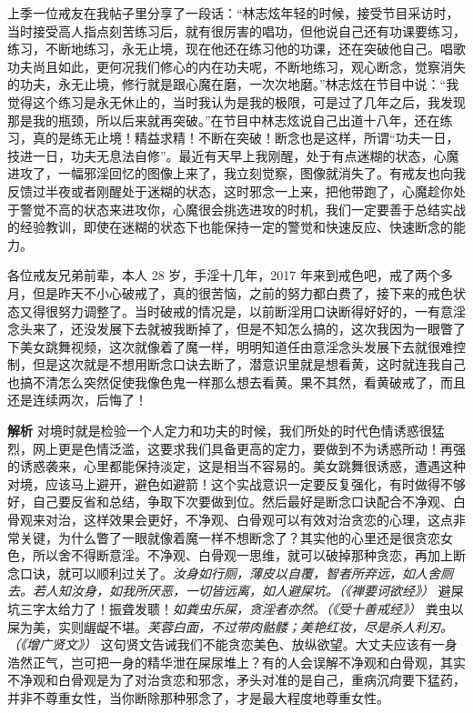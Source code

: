 \begin{case}[不是口诀没用]
    上季一位戒友在我帖子里分享了一段话：“林志炫年轻的时候，接受节目采访时，当时接受高人指点刻苦练习后，就有很厉害的唱功，但他说自己还有功课要练习，练习，不断地练习，永无止境，现在他还在练习他的功课，还在突破他自己。唱歌功夫尚且如此，更何况我们修心的内在功夫呢，不断地练习，观心断念，觉察消失的功夫，永无止境，修行就是跟心魔在磨，一次次地磨。”林志炫在节目中说：“我觉得这个练习是永无休止的，当时我认为是我的极限，可是过了几年之后，我发现那是我的瓶颈，所以后来就再突破。”在节目中林志炫说自己出道十八年，还在练习，真的是练无止境！精益求精！不断在突破！断念也是这样，所谓“功夫一日，技进一日，功夫无息法自修”。最近有天早上我刚醒，处于有点迷糊的状态，心魔进攻了，一幅邪淫回忆的图像上来了，我立刻觉察，图像就消失了。有戒友也向我反馈过半夜或者刚醒处于迷糊的状态，这时邪念一上来，把他带跑了，心魔趁你处于警觉不高的状态来进攻你，心魔很会挑选进攻的时机，我们一定要善于总结实战的经验教训，即使在迷糊的状态下也能保持一定的警觉和快速反应、快速断念的能力。
\end{case}

\begin{case}
    各位戒友兄弟前辈，本人 28 岁，手淫十几年，2017 年来到戒色吧，戒了两个多月，但是昨天不小心破戒了，真的很苦恼，之前的努力都白费了，接下来的戒色状态又得很努力调整了。当时破戒的情况是，以前断淫用口诀断得好好的，一有意淫念头来了，还没发展下去就被我断掉了，但是不知怎么搞的，这次我因为一眼瞥了下美女跳舞视频，这次就像着了魔一样，明明知道任由意淫念头发展下去就很难控制，但是这次就是不想用断念口诀去断了，潜意识里就是想看黄，这时就连我自己也搞不清怎么突然促使我像色鬼一样那么想去看黄。果不其然，看黄破戒了，而且还是连续两次，后悔了！

    \textbf{解析} 对境时就是检验一个人定力和功夫的时候，我们所处的时代色情诱惑很猛烈，网上更是色情泛滥，这要求我们具备更高的定力，要做到不为诱惑所动！再强的诱惑袭来，心里都能保持淡定，这是相当不容易的。美女跳舞很诱惑，遭遇这种对境，应该马上避开，避色如避箭！这个实战意识一定要反复强化，有时做得不够好，自己要反省和总结，争取下次要做到位。然后最好是断念口诀配合不净观、白骨观来对治，这样效果会更好，不净观、白骨观可以有效对治贪恋的心理，这点非常关键，为什么瞥了一眼就像着魔一样不想断念了？其实他的心里还是很贪恋女色，所以舍不得断意淫。不净观、白骨观一思维，就可以破掉那种贪恋，再加上断念口诀，就可以顺利过关了。\textit{汝身如行厕，薄皮以自覆，智者所弃远，如人舍厕去。若人知汝身，如我所厌恶，一切皆远离，如人避屎坑。（《禅要诃欲经》）} 避屎坑三字太给力了！振聋发聩！\textit{如粪虫乐屎，贪淫者亦然。（《受十善戒经》）} 粪虫以屎为美，实则龌龊不堪。\textit{芙蓉白面，不过带肉骷髅；美艳红妆，尽是杀人利刃。（《增广贤文》）} 这句贤文告诫我们不能贪恋美色、放纵欲望。大丈夫应该有一身浩然正气，岂可把一身的精华泄在屎尿堆上？有的人会误解不净观和白骨观，其实不净观和白骨观是为了对治贪恋和邪念，矛头对准的是自己，重病沉疴要下猛药，并非不尊重女性，当你断除那种邪念了，才是最大程度地尊重女性。
\end{case}

